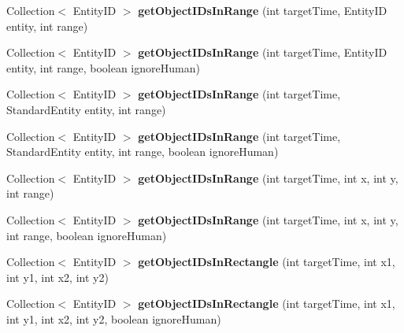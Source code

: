 \begin{DoxyCompactItemize}
Collection$<$ Entity\+ID $>$ {\bfseries get\+Object\+I\+Ds\+In\+Range} (int target\+Time, Entity\+ID entity, int range)
\item 
\hypertarget{classadf_1_1agent_1_1info_1_1WorldInfo_a76e169a031e21998e7d02f22336dddf0}{}\label{classadf_1_1agent_1_1info_1_1WorldInfo_a76e169a031e21998e7d02f22336dddf0} 
Collection$<$ Entity\+ID $>$ {\bfseries get\+Object\+I\+Ds\+In\+Range} (int target\+Time, Entity\+ID entity, int range, boolean ignore\+Human)
\item 
\hypertarget{classadf_1_1agent_1_1info_1_1WorldInfo_a3257a44b035ae0d6d0455db69dc19cbb}{}\label{classadf_1_1agent_1_1info_1_1WorldInfo_a3257a44b035ae0d6d0455db69dc19cbb} 
Collection$<$ Entity\+ID $>$ {\bfseries get\+Object\+I\+Ds\+In\+Range} (int target\+Time, Standard\+Entity entity, int range)
\item 
\hypertarget{classadf_1_1agent_1_1info_1_1WorldInfo_acec9fa08f7fd903b4a4a6e68557665ac}{}\label{classadf_1_1agent_1_1info_1_1WorldInfo_acec9fa08f7fd903b4a4a6e68557665ac} 
Collection$<$ Entity\+ID $>$ {\bfseries get\+Object\+I\+Ds\+In\+Range} (int target\+Time, Standard\+Entity entity, int range, boolean ignore\+Human)
\item 
\hypertarget{classadf_1_1agent_1_1info_1_1WorldInfo_aec5dc627d339f5c1a50fb25ae774c0f9}{}\label{classadf_1_1agent_1_1info_1_1WorldInfo_aec5dc627d339f5c1a50fb25ae774c0f9} 
Collection$<$ Entity\+ID $>$ {\bfseries get\+Object\+I\+Ds\+In\+Range} (int target\+Time, int x, int y, int range)
\item 
\hypertarget{classadf_1_1agent_1_1info_1_1WorldInfo_a6ade9bdab78bd52d533490ea6bc76c24}{}\label{classadf_1_1agent_1_1info_1_1WorldInfo_a6ade9bdab78bd52d533490ea6bc76c24} 
Collection$<$ Entity\+ID $>$ {\bfseries get\+Object\+I\+Ds\+In\+Range} (int target\+Time, int x, int y, int range, boolean ignore\+Human)
\item 
\hypertarget{classadf_1_1agent_1_1info_1_1WorldInfo_a294167a611162ee8e8d2b109cb8dd98d}{}\label{classadf_1_1agent_1_1info_1_1WorldInfo_a294167a611162ee8e8d2b109cb8dd98d} 
Collection$<$ Entity\+ID $>$ {\bfseries get\+Object\+I\+Ds\+In\+Rectangle} (int target\+Time, int x1, int y1, int x2, int y2)
\item 
\hypertarget{classadf_1_1agent_1_1info_1_1WorldInfo_aa2364491e12dc6b93f0fb32323df6f63}{}\label{classadf_1_1agent_1_1info_1_1WorldInfo_aa2364491e12dc6b93f0fb32323df6f63} 
Collection$<$ Entity\+ID $>$ {\bfseries get\+Object\+I\+Ds\+In\+Rectangle} (int target\+Time, int x1, int y1, int x2, int y2, boolean ignore\+Human)
\item 

\end{DoxyCompactItemize}
